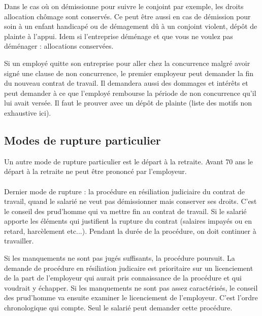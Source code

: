 	Dans le cas où on démissionne pour suivre le conjoint par exemple, les droits allocation chômage sont conservés.
	Ce peut être aussi en cas de démission pour soin à un enfant handicapé ou de démagement dû à un conjoint violent, dépôt de plainte à l'appui.
	Idem si l’entreprise déménage et que vous ne voulez pas déménager : allocations conservées.

	Si un employé quitte son entreprise pour aller chez la concurrence malgré avoir signé une clause de non concurrence, le premier employeur peut demander la fin du nouveau contrat de travail.
	Il demandera aussi des dommages et intérêts et peut demander à ce que l’employé rembourse la période de non concurrence qu’il lui avait versée.
	Il faut le prouver avec un dépôt de plainte (liste des motifs non exhaustive ici).

\subsection{Modes de rupture particulier}

	Un autre mode de rupture particulier est le départ à la retraite.
	Avant 70 ans le départ à la retraite ne peut être prononcé par l’employeur. 

	\paragraph{}
	Dernier mode de rupture : la procédure en résiliation judiciaire du contrat de travail, quand le salarié ne veut pas démissionner mais conserver ses droits.
	C’est le conseil des prud’homme qui va mettre fin au contrat de travail. Si le salarié apporte les éléments qui justifient la rupture du contrat (salaires impayés ou en retard, harcèlement etc...).
	Pendant la durée de la procédure, on doit continuer à travailler.

	Si les manquements ne sont pas jugés suffisants, la procédure poursuit.
	La demande de procédure en résiliation judicaire est prioritaire sur un licenciement de la part de l’employeur qui aurait pris connaissance de la procédure et qui voudrait y échapper.
	Si les manquements ne sont pas assez caractérisés, le conseil des prud’homme va ensuite examiner le licenciement de l’employeur.
	C’est l’ordre chronologique qui compte.
	Seul le salarié peut demander cette procédure.
